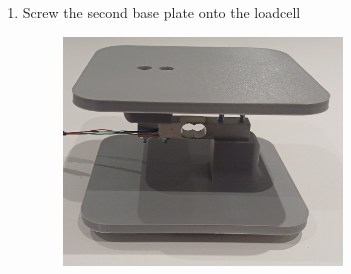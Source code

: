 \begin{enumerate}
\begin{figure}[h]
        \label{fig:ufscrewfirstbaseplate}
      \end{figure}
    \item Screw the second base plate onto the loadcell
    \begin{figure}[h]
        \centering
        \includegraphics[width=0.7\textwidth]{Figures/Manufacture/Uroflowmetry/uf_screw_second_baseplate.jpg}
        \label{fig:ufscrewfirstbaseplate}
      \end{figure}
  \end{enumerate}
  